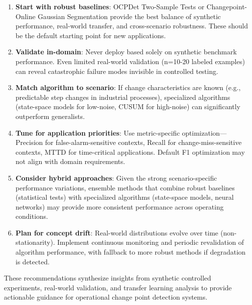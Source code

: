 \begin{enumerate}
    \item \textbf{Start with robust baselines}: OCPDet Two-Sample Tests or Changepoint-Online Gaussian Segmentation provide the best balance of synthetic performance, real-world transfer, and cross-scenario robustness. These should be the default starting point for new applications.
    
    \item \textbf{Validate in-domain}: Never deploy based solely on synthetic benchmark performance. Even limited real-world validation (n=10-20 labeled examples) can reveal catastrophic failure modes invisible in controlled testing.
    
    \item \textbf{Match algorithm to scenario}: If change characteristics are known (e.g., predictable step changes in industrial processes), specialized algorithms (state-space models for low-noise, CUSUM for high-noise) can significantly outperform generalists.
    
    \item \textbf{Tune for application priorities}: Use metric-specific optimization—Precision for false-alarm-sensitive contexts, Recall for change-miss-sensitive contexts, MTTD for time-critical applications. Default F1 optimization may not align with domain requirements.
    
    \item \textbf{Consider hybrid approaches}: Given the strong scenario-specific performance variations, ensemble methods that combine robust baselines (statistical tests) with specialized algorithms (state-space models, neural networks) may provide more consistent performance across operating conditions.
    
    \item \textbf{Plan for concept drift}: Real-world distributions evolve over time (non-stationarity). Implement continuous monitoring and periodic revalidation of algorithm performance, with fallback to more robust methods if degradation is detected.
\end{enumerate}

These recommendations synthesize insights from synthetic controlled experiments, real-world validation, and transfer learning analysis to provide actionable guidance for operational change point detection systems.

